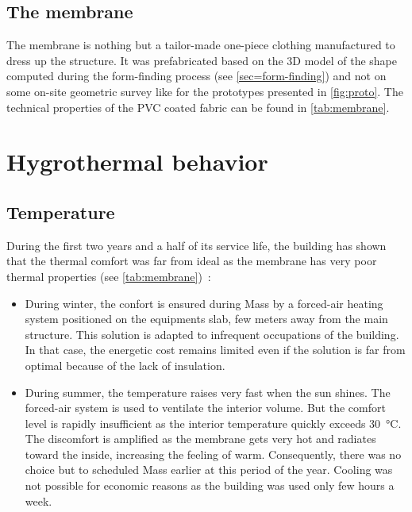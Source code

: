 \subsection{The membrane}
The membrane is nothing but a tailor-made one-piece clothing manufactured to dress up the structure. It was prefabricated based on the 3D model of the shape computed during the form-finding process (see \cref{sec=form-finding}) and not on some on-site geometric survey like for the prototypes presented in \cref{fig:proto}. The technical properties of the PVC coated fabric can be found in \cref{tab:membrane}.

\section{Hygrothermal behavior}\label{sec=hygro}
\subsection{Temperature}\label{sec=temperature}
During the first two years and a half of its service life, the building has shown that the thermal comfort was far from ideal as the membrane has very poor thermal properties (see \cref{tab:membrane})~:
\begin{itemize}
\item During winter, the confort is ensured during Mass by a forced-air heating system positioned on the equipments slab, few meters away from the main structure. This solution is adapted to infrequent occupations of the building. In that case, the energetic cost remains limited even if the solution is far from optimal because of the lack of insulation.
\item During summer, the temperature raises very fast when the sun shines. The forced-air system is used to ventilate the interior volume. But the comfort level is rapidly insufficient as the interior temperature quickly exceeds \SI{30}{\celsius}. The discomfort is amplified as the membrane gets very hot and radiates toward the inside, increasing the feeling of warm. Consequently, there was no choice but to scheduled Mass earlier at this period of the year. Cooling was not possible for economic reasons as the building was used only few hours a week.
\end{itemize}


